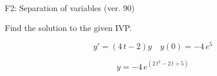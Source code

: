 \begin{exercise}
  \begin{exerciseTitle}F2: Separation of variables (ver. 90)\end{exerciseTitle}
  \begin{exerciseStatement}
    
Find the solution to the given IVP.

    
\[y'=( 4 \, t - 2 )y\hspace{1em} y(0)= -4 \, e^{5}\]

  \end{exerciseStatement}
  \begin{exerciseAnswer}
    
\[y= -4 \, e^{\left(2 \, t^{2} - 2 \, t + 5\right)}\]

  \end{exerciseAnswer}
\end{exercise}